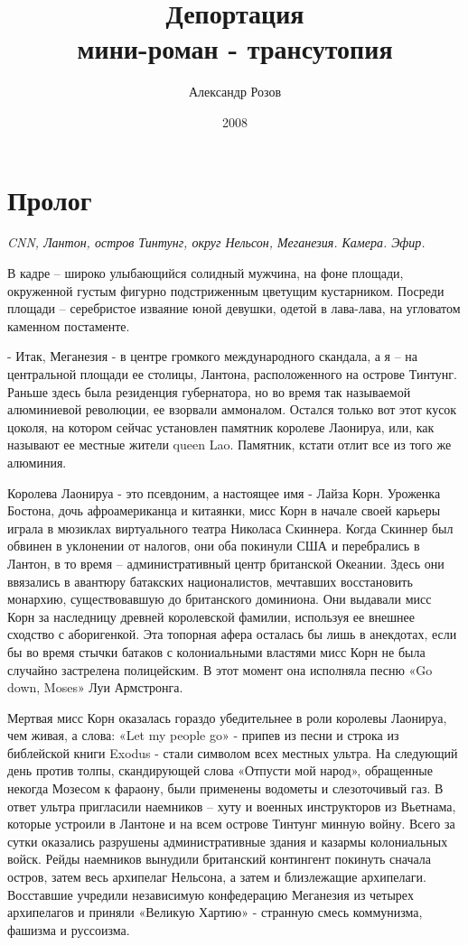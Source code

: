 \documentclass{book}
\title{Депортация\\мини-роман - трансутопия}
\author{Александр Розов}
\date{2008}
\newcommand{\myblock}[1] {
 {
   \begin{flushright}
    \parbox{2in}{{\small \textit{#1}}}
   \end{flushright}
 }
}
\begin{document}
\maketitle

\chapter*{Пролог}
\myblock{CNN, Лантон, остров Тинтунг, округ Нельсон, Меганезия. Камера. Эфир.}

В кадре -- широко улыбающийся солидный мужчина, на фоне площади, окруженной густым фигурно подстриженным цветущим кустарником. Посреди площади -- серебристое изваяние юной девушки, одетой в лава-лава, на угловатом каменном постаменте.

- Итак, Меганезия - в центре громкого международного скандала, а я -- на центральной площади ее столицы, Лантона, расположенного на острове Тинтунг. Раньше здесь была резиденция губернатора, но во время так называемой алюминиевой революции, ее взорвали аммоналом. Остался только вот этот кусок цоколя, на котором сейчас установлен памятник королеве Лаонируа, или, как называют ее местные жители queen Lao. Памятник, кстати отлит все из того же алюминия.

Королева Лаонируа - это псевдоним, а настоящее имя - Лайза Корн. Уроженка Бостона, дочь афроамериканца и китаянки, мисс Корн в начале своей карьеры играла в мюзиклах виртуального театра Николаса Скиннера. Когда Скиннер был обвинен в уклонении от налогов, они оба покинули США и перебрались в Лантон, в то время -- административный центр британской Океании. Здесь они ввязались в авантюру батакских националистов, мечтавших восстановить монархию, существовавшую до британского доминиона. Они выдавали мисс Корн за наследницу древней королевской фамилии, используя ее внешнее сходство с аборигенкой. Эта топорная афера осталась бы лишь в анекдотах, если бы во время стычки батаков с колониальными властями мисс Корн не была случайно застрелена полицейским. В этот момент она исполняла песню «Go down, Moses» Луи Армстронга.

Мертвая мисс Корн оказалась гораздо убедительнее в роли королевы Лаонируа, чем живая, а слова: «Let my people go» - припев из песни и строка из библейской книги Exodus - стали символом всех местных ультра. На следующий день против толпы, скандирующей слова «Отпусти мой народ», обращенные некогда Мозесом к фараону, были применены водометы и слезоточивый газ. В ответ ультра пригласили наемников -- хуту и военных инструкторов из Вьетнама, которые устроили в Лантоне и на всем острове Тинтунг минную войну. Всего за сутки оказались разрушены административные здания и казармы колониальных войск. Рейды наемников вынудили британский контингент покинуть сначала остров, затем весь архипелаг Нельсона, а затем и близлежащие архипелаги. Восставшие учредили независимую конфедерацию Меганезия из четырех архипелагов и приняли «Великую Хартию» - странную смесь коммунизма, фашизма и руссоизма.
\end{document}
